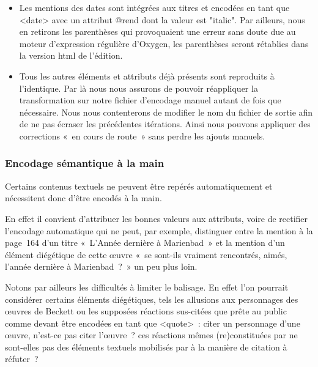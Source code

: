 \begin{itemize}
    \item Les mentions des dates sont intégrées aux titres et encodées en tant que <date> avec un attribut @rend dont la valeur est "italic". Par ailleurs, nous en retirons les parenthèses qui provoquaient une erreur sans doute due au moteur d'expression régulière d'Oxygen, les parenthèses seront rétablies dans la version html de l'édition.
    \item Tous les autres éléments et attributs déjà présents sont reproduits à l'identique. Par là nous nous assurons de pouvoir réappliquer la transformation sur notre fichier d'encodage manuel autant de fois que nécessaire. Nous nous contenterons de modifier le nom du fichier de sortie afin de ne pas écraser les précédentes itérations. Ainsi nous pouvons appliquer des corrections «~en cours de route~» sans perdre les ajouts manuels.
\end{itemize}


\subsubsection{Encodage sémantique à la main}
Certains contenus textuels ne peuvent être repérés automatiquement et nécessitent donc d'être encodés à la main.

En effet il convient d'attribuer les bonnes valeurs aux attributs, voire de rectifier l'encodage automatique qui ne peut, par exemple, distinguer entre la mention à la page~164 d'un titre «~L'Année dernière à Marienbad~» et la mention d'un élément diégétique de cette œuvre «~se sont-ils vraiment rencontrés, aimés, l’année dernière à Marienbad~?~» un peu plus loin.

Notons par ailleurs les difficultés à limiter le balisage. En effet l'on pourrait considérer certains éléments diégétiques, tels les allusions aux personnages des œuvres de Beckett ou les supposées réactions sus-citées que \robbe{} prête au public comme devant être encodées en tant que <quote>~: citer un personnage d'une œuvre, n'est-ce pas citer l'œuvre~? ces réactions mêmes (re)constituées par \robbe{} ne sont-elles pas des éléments textuels mobilisés par \robbe{} à la manière de citation à réfuter~?

